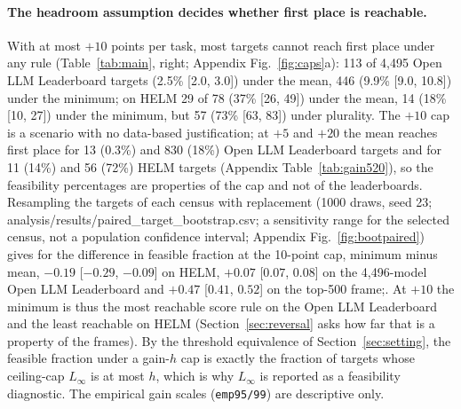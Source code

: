 \paragraph{The headroom assumption decides whether first place is reachable.}
With at most $+10$ points per task, most targets cannot reach first place under any rule (Table~\ref{tab:main}, right; Appendix Fig.~\ref{fig:caps}a): 113 of 4{,}495 Open LLM Leaderboard targets (2.5\% [2.0, 3.0]) under the mean, 446 (9.9\% [9.0, 10.8]) under the minimum; on HELM 29 of 78 (37\% [26, 49]) under the mean, 14 (18\% [10, 27]) under the minimum, but 57 (73\% [63, 83]) under plurality. The $+10$ cap is a scenario with no data-based justification; at $+5$ and $+20$ the mean reaches first place for 13 (0.3\%) and 830 (18\%) Open LLM Leaderboard targets and for 11 (14\%) and 56 (72\%) HELM targets (Appendix Table~\ref{tab:gain520}), so the feasibility percentages are properties of the cap and not of the leaderboards. Resampling the targets of each census with replacement (1000 draws, seed 23; analysis/results/paired\_target\_bootstrap.csv; a sensitivity range for the selected census, not a population confidence interval; Appendix Fig.~\ref{fig:bootpaired}) gives for the difference in feasible fraction at the 10-point cap, minimum minus mean, $-0.19$ [$-0.29$, $-0.09$] on HELM, $+0.07$ [$0.07$, $0.08$] on the 4,496-model Open LLM Leaderboard and $+0.47$ [$0.41$, $0.52$] on the top-500 frame;. At $+10$ the minimum is thus the most reachable score rule on the Open LLM Leaderboard and the least reachable on HELM (Section~\ref{sec:reversal} asks how far that is a property of the frames). By the threshold equivalence of Section~\ref{sec:setting}, the feasible fraction under a gain-$h$ cap is exactly the fraction of targets whose ceiling-cap $L_\infty$ is at most $h$, which is why $L_\infty$ is reported as a feasibility diagnostic. The empirical gain scales (\texttt{emp95/99}) are descriptive only.

